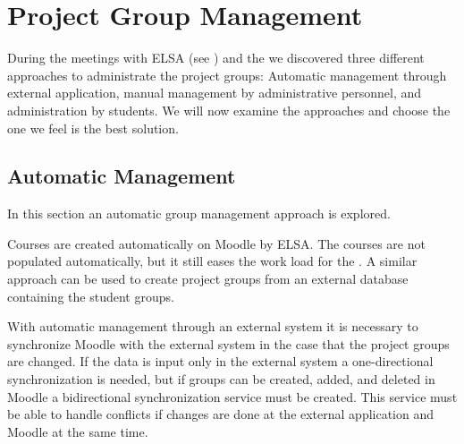 \section{Project Group Management}
\label{sec:groupManagement}
\label{sec:projectgroupadministration}
During the meetings with ELSA (see ) and the \admpers{} we discovered three different approaches to administrate the project groups: Automatic management through external application, manual management by administrative personnel, and administration by students. 
We will now examine the approaches and choose the one we feel is the best solution.


\subsection{Automatic Management}
\label{sub:automanagement}
In this section an automatic group management approach is explored.  

Courses are created automatically on Moodle by ELSA.
The courses are not populated automatically, but it still eases the work load for the \admpers{}.  
A similar approach can be used to create project groups from an external database containing the student groups. 

With automatic management through an external system it is necessary to synchronize Moodle with the external system in the case that the project groups are changed. 
If the data is input only in the external system a one-directional synchronization is needed, but if groups can be created, added, and deleted in Moodle a bidirectional synchronization service must be created. 
This service must be able to handle conflicts if changes are done at the external application and Moodle at the same time.

